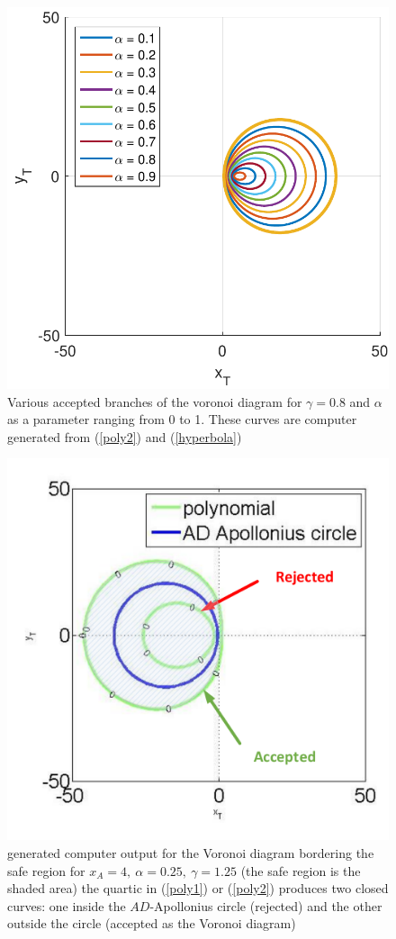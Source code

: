 \documentclass[final,5p,times,twocolumn]{elsarticle}
\begin{document}
\begin{figure}[htb]
\centering
\includegraphics[width=0.75\columnwidth]{VAR_alpha_g_0p8.pdf}
\caption{Various accepted branches of the voronoi diagram for $\gamma=0.8$ and $\alpha$ as a parameter ranging from 0 to 1. These curves are computer generated from (\ref{poly2}) and (\ref{hyperbola})}
\label{VAR_alpha_gamma=0.8}
\end{figure}


\begin{figure}[htb]
\centering
\includegraphics[width=0.75\columnwidth]{g_1p25.pdf}
\caption{generated computer output for the Voronoi diagram bordering the safe region for $x_A=4,\ \alpha=0.25,\ \gamma=1.25$ (the safe region is the shaded area) the quartic in (\ref{poly1}) or (\ref{poly2}) produces two closed curves: one inside the $AD$-Apollonius circle (rejected) and the other outside the circle (accepted as the Voronoi diagram)}
\label{gamma=1.25}
\end{figure}
\end{document}
